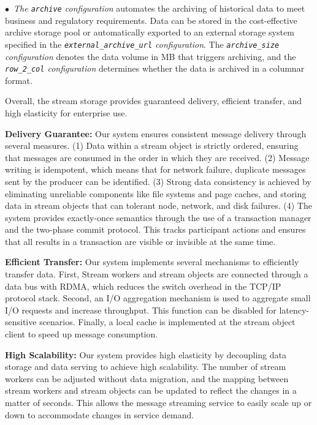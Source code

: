 $\bullet$~\textit{The \texttt{archive} configuration} automates the archiving of historical data to meet business and regulatory requirements. Data can be stored in the cost-effective \sys archive storage pool or automatically exported to an external storage system specified in the \textit{\texttt{external\_archive\_url} configuration}. The \textit{\texttt{archive\_size} configuration} denotes the data volume in MB that triggers archiving, and the \textit{\texttt{row\_2\_col} configuration} determines whether the data is archived in a columnar format. 

Overall, the \sys stream storage provides guaranteed delivery, efficient transfer, and high elasticity for enterprise use.

\noindent\textbf{Delivery Guarantee:} Our system ensures consistent message delivery through several measures. (1) Data within a stream object is strictly ordered, ensuring that messages are consumed in the order in which they are received. (2) Message writing is idempotent, which means that for network failure, duplicate messages sent by the producer  can be identified.
 (3) Strong data consistency is achieved by eliminating unreliable components like file systems and page caches, and storing data in  stream objects that can tolerant node, network, and disk failures. (4) The system provides exactly-once semantics through the use of a transaction manager and the two-phase commit protocol. This tracks participant actions and ensures that all results in a transaction are visible or invisible at the same time.
 

\noindent\textbf{Efficient Transfer:} Our system implements several mechanisms to efficiently transfer data. First, Stream workers and stream objects are connected through a data bus with RDMA, which reduces the switch overhead in the TCP/IP protocol stack. Second, an I/O aggregation mechanism is used to aggregate small I/O requests and increase throughput. This function can be disabled for latency-sensitive scenarios. Finally, a local cache is implemented at the stream object client to speed up message consumption.

\noindent\textbf{High Scalability:} Our system provides high elasticity by decoupling data storage and data serving to achieve high scalability. The number of stream workers can be adjusted without data migration, and the mapping between stream workers and stream objects can be updated to reflect the changes in a matter of seconds. This allows the message streaming service to easily scale up or down to accommodate changes in service demand.



